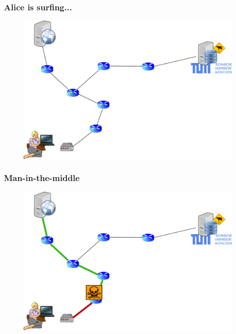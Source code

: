 \begin{frame}
\frametitle{Alice is surfing...}
  \begin{block}{}
    \vskip -1.2cm
    \begin{figure}[t]
    \centering
     \includegraphics[scale=.36]{figures/reporting}
    \end{figure}
  \end{block}
\end{frame}

\begin{frame}
\frametitle{Man-in-the-middle}
  \begin{block}{}
    \vskip -1.1cm
    \begin{figure}[t]
    \centering
     \includegraphics[scale=.36]{figures/reporting-2-attacked}
    \end{figure}
  \end{block}
\end{frame}

